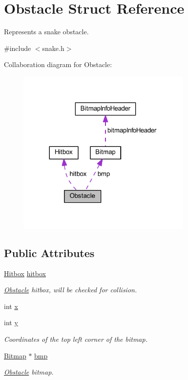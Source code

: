 \hypertarget{struct_obstacle}{}\section{Obstacle Struct Reference}
\label{struct_obstacle}


Represents a snake obstacle.  




{\ttfamily \#include $<$snake.\+h$>$}



Collaboration diagram for Obstacle\+:\nopagebreak
\begin{figure}[H]
\begin{center}
\leavevmode
\includegraphics[width=245pt]{struct_obstacle__coll__graph}
\end{center}
\end{figure}
\subsection*{Public Attributes}
\begin{DoxyCompactItemize}
\item 
\mbox{\hyperlink{struct_hitbox}{Hitbox}} \mbox{\hyperlink{group__snake_ga7db468fea7e79f8f801944afbea0501e}{hitbox}}
\begin{DoxyCompactList}\small\item\em \mbox{\hyperlink{struct_obstacle}{Obstacle}} hitbox, will be checked for collision. \end{DoxyCompactList}\item 
int \mbox{\hyperlink{group__snake_gaf70994e9c31a4b2fbd941479e13684af}{x}}
\item 
int \mbox{\hyperlink{group__snake_ga30b2c3c1f048ca6013dcd237e6948f5c}{y}}
\begin{DoxyCompactList}\small\item\em Coordinates of the top left corner of the bitmap. \end{DoxyCompactList}\item 
\mbox{\hyperlink{struct_bitmap}{Bitmap}} $\ast$ \mbox{\hyperlink{group__snake_ga97d18d6a1e7337ec4126c187a74074b7}{bmp}}
\begin{DoxyCompactList}\small\item\em \mbox{\hyperlink{struct_obstacle}{Obstacle}} bitmap. \end{DoxyCompactList}\end{DoxyCompactItemize}


